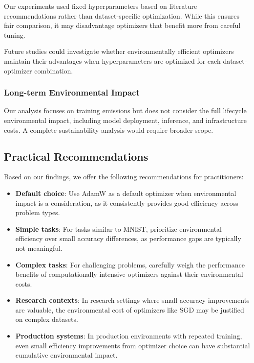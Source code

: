 \documentclass[conference]{IEEEtran}
\begin{document}
Our experiments used fixed hyperparameters based on literature recommendations rather than dataset-specific optimization. While this ensures fair comparison, it may disadvantage optimizers that benefit more from careful tuning.

Future studies could investigate whether environmentally efficient optimizers maintain their advantages when hyperparameters are optimized for each dataset-optimizer combination.

\subsubsection{Long-term Environmental Impact}

Our analysis focuses on training emissions but does not consider the full lifecycle environmental impact, including model deployment, inference, and infrastructure costs. A complete sustainability analysis would require broader scope.

\subsection{Practical Recommendations}

Based on our findings, we offer the following recommendations for practitioners:

\begin{itemize}
    \item \textbf{Default choice}: Use AdamW as a default optimizer when environmental impact is a consideration, as it consistently provides good efficiency across problem types.
    
    \item \textbf{Simple tasks}: For tasks similar to MNIST, prioritize environmental efficiency over small accuracy differences, as performance gaps are typically not meaningful.
    
    \item \textbf{Complex tasks}: For challenging problems, carefully weigh the performance benefits of computationally intensive optimizers against their environmental costs.
    
    \item \textbf{Research contexts}: In research settings where small accuracy improvements are valuable, the environmental cost of optimizers like SGD may be justified on complex datasets.
    
    \item \textbf{Production systems}: In production environments with repeated training, even small efficiency improvements from optimizer choice can have substantial cumulative environmental impact.
\end{itemize}
\end{document}
